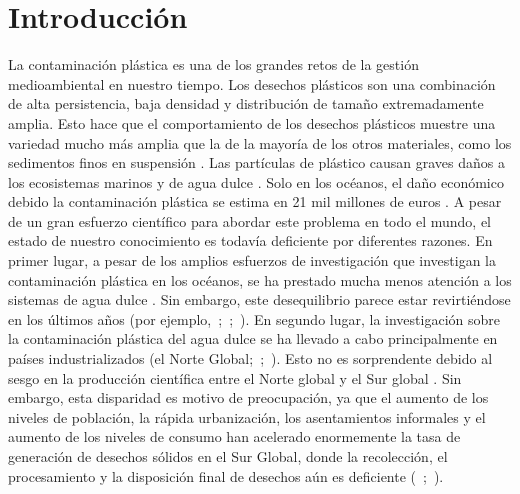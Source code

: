 \section{Introducción}
\label{sec:introduccion}
La contaminación plástica es una de los grandes retos de la gestión medioambiental en nuestro tiempo. Los desechos plásticos son una combinación de alta persistencia, baja densidad y distribución de tamaño extremadamente amplia. Esto hace que el comportamiento de los desechos plásticos muestre una variedad mucho más amplia que la de la mayoría de los otros materiales, como los sedimentos finos en suspensión \parencite{Wu2018}. Las partículas de plástico causan graves daños a los ecosistemas marinos y de agua dulce \parencite{AnthonyBrowne2011}. Solo en los océanos, el daño económico debido la contaminación plástica se estima en 21 mil millones de euros \parencite{Beaumont2019}. A pesar de un gran esfuerzo científico para abordar este problema en todo el mundo, el estado de nuestro conocimiento es todavía deficiente por diferentes razones. En primer lugar, a pesar de los amplios esfuerzos de investigación que investigan la contaminación plástica en los océanos, se ha prestado mucha menos atención a los sistemas de agua dulce \parencite{Blettler2017}. Sin embargo, este desequilibrio parece estar revirtiéndose en los últimos años (por ejemplo,~\cite{GUNDOGDU2018342};~\cite{Battulga2019};~\cite{VANWIJNEN2019392}). En segundo lugar, la investigación sobre la contaminación plástica del agua dulce se ha llevado a cabo principalmente en países industrializados (el Norte Global;~\cite{Rochman2015};~\cite{Blettler2017}). Esto no es sorprendente debido al sesgo en la producción científica entre el Norte global y el Sur global \parencite{Guterl2012}. Sin embargo, esta disparidad es motivo de preocupación, ya que el aumento de los niveles de población, la rápida urbanización, los asentamientos informales y el aumento de los niveles de consumo han acelerado enormemente la tasa de generación de desechos sólidos en el Sur Global, donde la recolección, el procesamiento y la disposición final de desechos aún es deficiente (~\cite{MINGHUA20091227};~\cite{UnitedNationsHumanSettlementsProgramme2016}).


